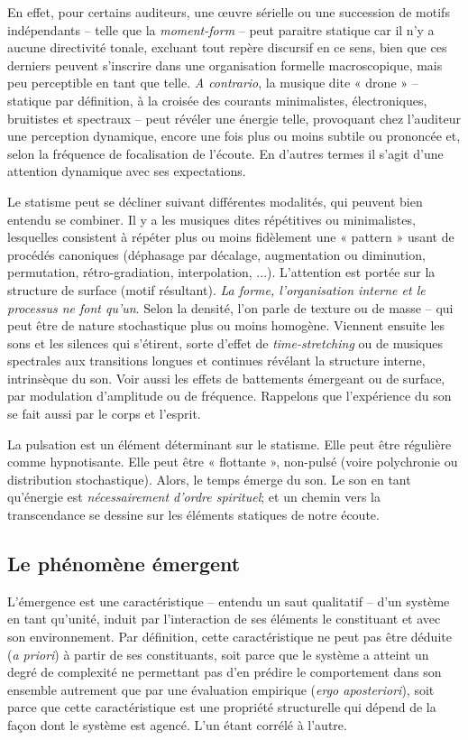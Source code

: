 \documentclass{article}
\begin{document}
En effet, pour certains auditeurs, une œuvre sérielle ou une succession de motifs indépendants -- telle que la \textit{moment-form} -- peut paraitre statique car il n'y a aucune directivité tonale, excluant tout repère discursif en ce sens, bien que ces derniers peuvent s'inscrire dans une organisation formelle macroscopique, mais peu perceptible en tant que telle. \textit{A contrario}, la musique dite « drone »  -- statique par définition, à la croisée des courants minimalistes, électroniques, bruitistes et spectraux -- peut révéler une énergie telle, provoquant chez l'auditeur une perception dynamique, encore une fois plus ou moins subtile ou prononcée et, selon la fréquence de focalisation de l'écoute. En d'autres termes il s'agit d'une attention dynamique avec ses expectations.

Le statisme peut se décliner suivant différentes modalités, qui peuvent bien entendu se combiner. Il y a les musiques dites répétitives ou minimalistes, lesquelles consistent à répéter plus ou moins fidèlement une « pattern » usant de procédés canoniques (déphasage par décalage, augmentation ou diminution, permutation, rétro-gradiation, interpolation, ...). L'attention est portée sur la structure de surface (motif résultant). \textit{La  forme, l'organisation interne et le processus ne font qu'un}. Selon la densité, l'on parle de texture ou de masse -- qui peut être de nature stochastique plus ou moins homogène. Viennent ensuite les sons et les silences qui s'étirent, sorte d'effet de \textit{time-stretching} ou de musiques spectrales aux transitions longues et continues révélant la structure interne, intrinsèque du son. Voir aussi les effets de battements émergeant ou de surface, par modulation d'amplitude ou de fréquence. Rappelons que l'expérience du son se fait aussi par le corps et l'esprit. 

La pulsation est un élément déterminant sur le statisme. Elle peut être régulière comme hypnotisante. Elle peut être « flottante », non-pulsé (voire polychronie ou distribution stochastique). Alors, le temps émerge du son. Le son en tant qu'énergie est \textit{nécessairement d’ordre spirituel}; et un chemin vers la transcendance se dessine sur les éléments statiques de notre écoute.

\subsection*{Le phénomène émergent}
\label{emergent}
 
 L'émergence est une caractéristique -- entendu un saut qualitatif -- d'un système en tant qu'unité, induit par l'interaction de ses éléments le constituant et avec son environnement. Par définition, cette caractéristique ne peut pas être déduite (\textit{a priori}) à partir de ses constituants, soit parce que le système a atteint un degré de complexité ne permettant pas d'en prédire le comportement dans son ensemble autrement que par une évaluation empirique (\textit{ergo aposteriori}), soit parce que cette caractéristique est une propriété structurelle qui dépend de la façon dont le système est agencé. 
 L'un étant corrélé à l'autre.
\end{document}
